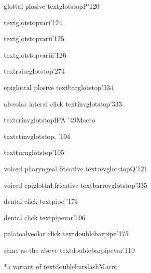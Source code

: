 %
  {glottal plosive}%
  {\tbs textglotstop}{P}{\ipaall}{'120}

%
  {}%
  {\tbs textglotstopvari}{}{\PSG}{'124}

%
  {}%
  {\tbs textglotstopvarii}{}{\PSG}{'125}

%
  {}%
  {\tbs textglotstopvariii}{}{\PSG}{'126}

%
  {}%
  {\tbs textraiseglotstop}{}{}{'274}

%
  {epiglottal plosive}%
  {\tbs textbarglotstop}{}{\ipanew}{'334}

%
  {alveolar lateral click}%
  {\tbs textinvglotstop}{}{\ipaold}{'333}

%
  {}%
  {\tbs textcrinvglotstop}{}{IPA '49}{Macro}

%
  {}%
  {\tbs textctinvglotstop}{}{\cite{Hottentot}, \PSG}{'104}

%
  {}%
  {\tbs textturnglotstop}{}{\PSG}{'105}

%
  {voiced pharyngeal fricative}%
  {\tbs textrevglotstop}{Q}{\ipaall}{'121}

%
  {voiced epiglottal fricative}%
  {\tbs textbarrevglotstop}{}{\ipanew}{'335}

%
  {dental click}%
  {\tbs textpipe}{|}{\ipanew}{'174}

%
  {dental click}%
  {\tbs textpipevar}{}{\PSG}{'106}

%
  {palatoalveolar click}%
  {\tbs textdoublebarpipe}{}{\ipanew}{'175}

%
  {same as the above}%
  {\tbs textdoublebarpipevar}{}{\PSG}{'110}

%
  {*a variant of \textdoublebarpipe}%
  {\tbs textdoublebarslash}{}{\PSG}{Macro}

